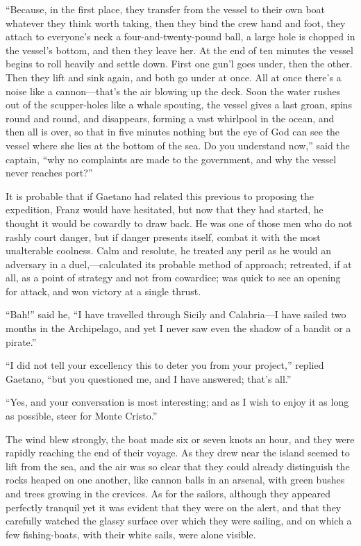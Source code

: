 “Because, in the first place, they transfer from the vessel to their
own boat whatever they think worth taking, then they bind the crew hand
and foot, they attach to everyone’s neck a four-and-twenty-pound ball,
a large hole is chopped in the vessel’s bottom, and then they leave
her. At the end of ten minutes the vessel begins to roll heavily and
settle down. First one gun’l goes under, then the other. Then they lift
and sink again, and both go under at once. All at once there’s a noise
like a cannon—that’s the air blowing up the deck. Soon the water rushes
out of the scupper-holes like a whale spouting, the vessel gives a last
groan, spins round and round, and disappears, forming a vast whirlpool
in the ocean, and then all is over, so that in five minutes nothing but
the eye of God can see the vessel where she lies at the bottom of the
sea. Do you understand now,” said the captain, “why no complaints are
made to the government, and why the vessel never reaches port?”

It is probable that if Gaetano had related this previous to proposing
the expedition, Franz would have hesitated, but now that they had
started, he thought it would be cowardly to draw back. He was one of
those men who do not rashly court danger, but if danger presents
itself, combat it with the most unalterable coolness. Calm and
resolute, he treated any peril as he would an adversary in a
duel,—calculated its probable method of approach; retreated, if at all,
as a point of strategy and not from cowardice; was quick to see an
opening for attack, and won victory at a single thrust.

“Bah!” said he, “I have travelled through Sicily and Calabria—I have
sailed two months in the Archipelago, and yet I never saw even the
shadow of a bandit or a pirate.”

“I did not tell your excellency this to deter you from your project,”
replied Gaetano, “but you questioned me, and I have answered; that’s
all.”

“Yes, and your conversation is most interesting; and as I wish to enjoy
it as long as possible, steer for Monte Cristo.”

The wind blew strongly, the boat made six or seven knots an hour, and
they were rapidly reaching the end of their voyage. As they drew near
the island seemed to lift from the sea, and the air was so clear that
they could already distinguish the rocks heaped on one another, like
cannon balls in an arsenal, with green bushes and trees growing in the
crevices. As for the sailors, although they appeared perfectly tranquil
yet it was evident that they were on the alert, and that they carefully
watched the glassy surface over which they were sailing, and on which a
few fishing-boats, with their white sails, were alone visible.


